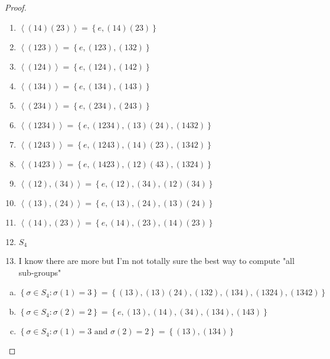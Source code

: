 \documentclass{article}
\theoremstyle{definition}
\theoremstyle{remark}
\begin{document}
\begin{proof}
\begin{multicols}{3}
\begin{enumerate}
			\item $\left\langle (14)(23) \right\rangle=\left\{e,(14)(23)\right\}$
			\item $\left\langle (123) \right\rangle=\left\{e,(123),(132)\right\}$
			\item $\left\langle (124) \right\rangle=\left\{e,(124),(142)\right\}$
			\item $\left\langle (134) \right\rangle=\left\{e,(134),(143)\right\}$
			\item $\left\langle (234) \right\rangle=\left\{e,(234),(243)\right\}$
			\item $\left\langle (1234) \right\rangle=\left\{e,(1234),(13)(24),(1432)\right\}$
			\item $\left\langle (1243) \right\rangle=\left\{e,(1243),(14)(23),(1342)\right\}$
			\item $\left\langle (1423) \right\rangle=\left\{e,(1423),(12)(43),(1324)\right\}$
			\item $\left\langle (12),(34) \right\rangle=\left\{e,(12),(34),(12)(34)\right\}$
			\item $\left\langle (13),(24) \right\rangle=\left\{e,(13),(24),(13)(24)\right\}$
			\item $\left\langle (14),(23) \right\rangle=\left\{e,(14),(23),(14)(23)\right\}$
			\item $S_4$
			\item I know there are more but I'm not totally sure the best way to compute "all sub-groups"
		\end{enumerate}
		\end{multicols}
		\begin{enumerate}[(a)]
			\item $\left\{\sigma\in S_4:\sigma\left(1\right)=3
			\right\}=\left\{(13),(13)(24),(132),(134),(1324),(1342)\right\}$
			\item $\left\{\sigma\in S_4:\sigma\left(2\right)=2\right\}=\left\{e,(13),(14),(34),(134),(143)\right\}$
			\item $\left\{\sigma\in S_4:\sigma\left(1\right)=3\text{ and }\sigma\left(2\right)=2\right\}=\left\{(13),(134)\right\}$
		\end{enumerate}
	
	\end{proof}
\end{document}

